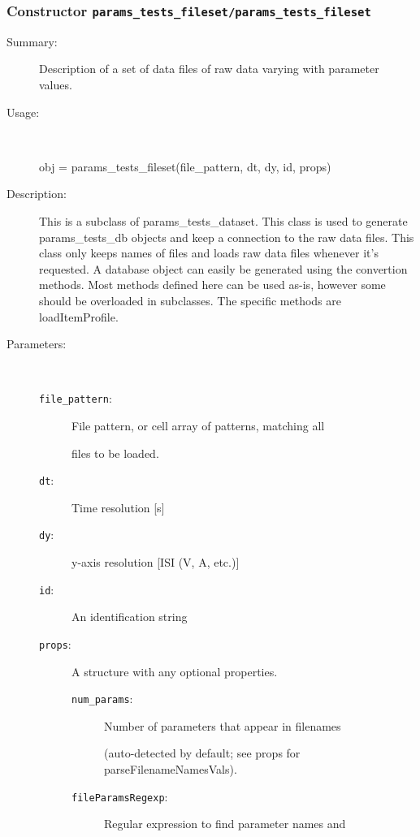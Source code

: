 \subsubsection[Constructor \texttt{params\_tests\_fileset}]{Constructor \texttt{params\_tests\_fileset/params\_tests\_fileset}}%
%
\label{ref_params_tests_fileset__params_tests_fileset}%
\hypertarget{ref_params_tests_fileset__params_tests_fileset}{}%
\begin{description}
\item[Summary:]Description of a set of data files of raw data varying with parameter values.
%
\item[Usage:]~%
\begin{lyxcode}%
obj = params\_tests\_fileset(file\_pattern, dt, dy, id, props)
%
\end{lyxcode}%
%
\item[Description:]%
This is a subclass of params\_tests\_dataset. This class is used to
 generate params\_tests\_db objects and keep a connection to the raw
 data files. This class only keeps names of files and loads raw data
 files whenever it's requested. A database object can easily be
 generated using the convertion methods.  Most methods defined here
 can be used as-is, however some should be overloaded in subclasses.
 The specific methods are loadItemProfile.
\item[Parameters:]~
\begin{description}%
\item[\texttt{file\_pattern}:]
 File pattern, or cell array of patterns, matching all 

files to be loaded.
\item[\texttt{dt}:]
 Time resolution [s]
\item[\texttt{dy}:]
 y-axis resolution [ISI (V, A, etc.)]
\item[\texttt{id}:]
 An identification string
\item[\texttt{props}:]
 A structure with any optional properties.
\begin{description}%
\item[\texttt{num\_params}:]
 Number of parameters that appear in filenames

(auto-detected by default; see props for
parseFilenameNamesVals).
\item[\texttt{fileParamsRegexp}:]
 Regular expression to find parameter names and


\end{description}
\end{description}
\end{description}
